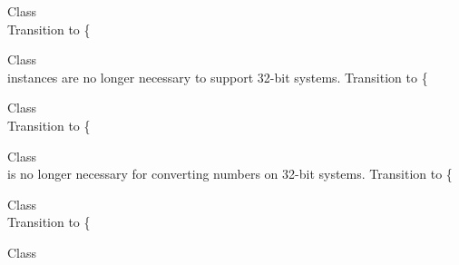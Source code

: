 \begin{DoxyRefList}
\item[Class \doxylink{class_ramsey_1_1_uuid_1_1_builder_1_1_default_uuid_builder}{Ramsey\textbackslash{}Uuid\textbackslash{}Builder\textbackslash{}Default\+Uuid\+Builder} ]\hfill \\
\label{deprecated__deprecated000266}%
%
Transition to \{ 
\item[Class \doxylink{class_ramsey_1_1_uuid_1_1_builder_1_1_degraded_uuid_builder}{Ramsey\textbackslash{}Uuid\textbackslash{}Builder\textbackslash{}Degraded\+Uuid\+Builder} ]\hfill \\
\label{deprecated__deprecated000267}%
%
 instances are no longer necessary to support 32-\/bit systems. Transition to \{ 
\item[Class \doxylink{class_ramsey_1_1_uuid_1_1_converter_1_1_number_1_1_big_number_converter}{Ramsey\textbackslash{}Uuid\textbackslash{}Converter\textbackslash{}Number\textbackslash{}Big\+Number\+Converter} ]\hfill \\
\label{deprecated__deprecated000268}%
%
Transition to \{ 
\item[Class \doxylink{class_ramsey_1_1_uuid_1_1_converter_1_1_number_1_1_degraded_number_converter}{Ramsey\textbackslash{}Uuid\textbackslash{}Converter\textbackslash{}Number\textbackslash{}Degraded\+Number\+Converter} ]\hfill \\
\label{deprecated__deprecated000269}%
%
 is no longer necessary for converting numbers on 32-\/bit systems. Transition to \{ 
\item[Class \doxylink{class_ramsey_1_1_uuid_1_1_converter_1_1_time_1_1_big_number_time_converter}{Ramsey\textbackslash{}Uuid\textbackslash{}Converter\textbackslash{}Time\textbackslash{}Big\+Number\+Time\+Converter} ]\hfill \\
\label{deprecated__deprecated000270}%
%
Transition to \{ 
\item[Class \doxylink{class_ramsey_1_1_uuid_1_1_converter_1_1_time_1_1_degraded_time_converter}{Ramsey\textbackslash{}Uuid\textbackslash{}Converter\textbackslash{}Time\textbackslash{}Degraded\+Time\+Converter} ]\hfill \\
\label{deprecated__deprecated000271}%
%

\end{DoxyRefList}
